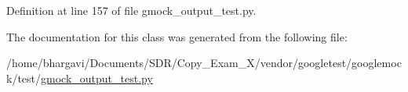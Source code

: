 Definition at line 157 of file gmock\+\_\+output\+\_\+test.\+py.



The documentation for this class was generated from the following file\+:\begin{DoxyCompactItemize}
\item 
/home/bhargavi/\+Documents/\+S\+D\+R/\+Copy\+\_\+\+Exam\+\_\+X/vendor/googletest/googlemock/test/\hyperlink{gmock__output__test_8py}{gmock\+\_\+output\+\_\+test.\+py}\end{DoxyCompactItemize}
